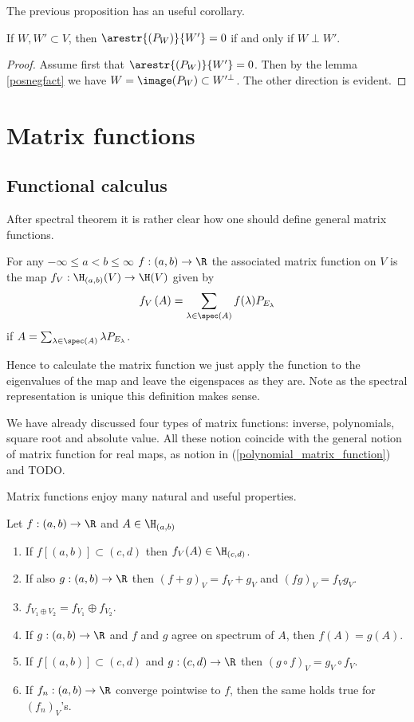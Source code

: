 The previous proposition has an useful corollary.

\begin{kor}\label{projection_compression}
	If $W, W' \subset V$, then $\arestr{(P_{W})}{W'} = 0$ if and only if $W \perp W'$.
\end{kor}
\begin{proof}
	Assume first that $\arestr{(P_{W})}{W'} = 0$. Then by the lemma \ref{posnegfact} we have $W = \image(P_{W}) \subset W'^{\perp}$. The other direction is evident.
\end{proof}

\section{Matrix functions}

\subsection{Functional calculus}

After spectral theorem it is rather clear how one should define general matrix functions.

\begin{maar}
	For any $-\infty \leq a < b \leq \infty$ $f : (a, b) \to \R$ the associated matrix function on $V$ is the map $f_{V} : \H_{(a, b)}(V) \to \H(V)$ given by
	\[
		f_{V}\left(A\right) = \sum_{\lambda \in \spec(A)} f(\lambda) P_{E_{\lambda}}
	\]
	if $A = \sum_{\lambda \in \spec(A)} \lambda P_{E_{\lambda}}$.
\end{maar}
Hence to calculate the matrix function we just apply the function to the eigenvalues of the map and leave the eigenspaces as they are. Note as the spectral representation is unique this definition makes sense.

We have already discussed four types of matrix functions: inverse, polynomials, square root and absolute value. All these notion coincide with the general notion of matrix function for real maps, as notion in (\ref{polynomial_matrix_function}) and TODO.

Matrix functions enjoy many natural and useful properties.

\begin{prop}\label{basic_matrix}
	Let $f : (a,b) \to \R$ and $A \in \H_{(a, b)}$
	\begin{enumerate}
		\item If $f[(a, b)] \subset (c, d)$ then $f_{V}(A) \in \H_{(c, d)}$.
		\item If also $g : (a, b) \to \R$ then $(f + g)_{V} = f_{V} + g_{V}$ and $(fg)_{V} = f_{V}g_{V}$.
		\item $f_{V_{1} \oplus V_{2}} = f_{V_{1}} \oplus f_{V_{2}}$.
		\item If $g : (a, b) \to \R$ and $f$ and $g$ agree on spectrum of $A$, then $f(A) = g(A)$.
		\item If $f[(a, b)] \subset (c, d)$ and $g : (c, d) \to \R$ then $(g \circ f)_{V} = g_{V} \circ f_{V}$.
		\item If $f_{n} : (a, b) \to \R$ converge pointwise to $f$, then the same holds true for $(f_{n})_{V}$'s.
	\end{enumerate}
\end{prop}

